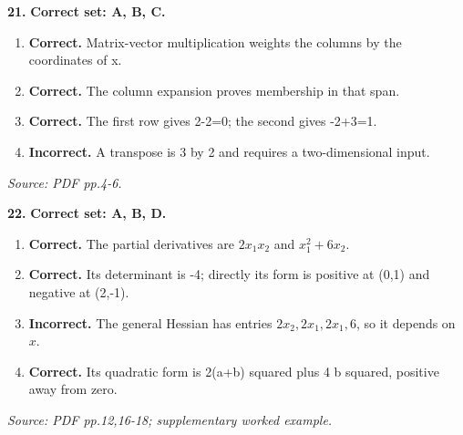 \documentclass[11pt,a4paper]{article}
\begin{document}
\par\noindent\begin{minipage}{\linewidth}
\textbf{21.} \textbf{Correct set: A, B, C.}
\begin{enumerate}[label=(\Alph*),leftmargin=8mm,itemsep=2pt,topsep=2pt]
\item \textbf{Correct.} Matrix-vector multiplication weights the columns by the coordinates of x.
\item \textbf{Correct.} The column expansion proves membership in that span.
\item \textbf{Correct.} The first row gives 2-2=0; the second gives -2+3=1.
\item \textbf{Incorrect.} A transpose is 3 by 2 and requires a two-dimensional input.
\end{enumerate}
{\footnotesize\textit{Source: PDF pp.4-6.}}

\end{minipage}\par\vspace{3mm}
\par\noindent\begin{minipage}{\linewidth}
\textbf{22.} \textbf{Correct set: A, B, D.}
\begin{enumerate}[label=(\Alph*),leftmargin=8mm,itemsep=2pt,topsep=2pt]
\item \textbf{Correct.} The partial derivatives are \(2x_1x_2\) and \(x_1^2+6x_2\).
\item \textbf{Correct.} Its determinant is -4; directly its form is positive at (0,1) and negative at (2,-1).
\item \textbf{Incorrect.} The general Hessian has entries \(2x_2,2x_1,2x_1,6\), so it depends on \(x\).
\item \textbf{Correct.} Its quadratic form is 2(a+b) squared plus 4 b squared, positive away from zero.
\end{enumerate}
{\footnotesize\textit{Source: PDF pp.12,16-18; supplementary worked example.}}

\end{minipage}\par\vspace{3mm}
\end{document}
